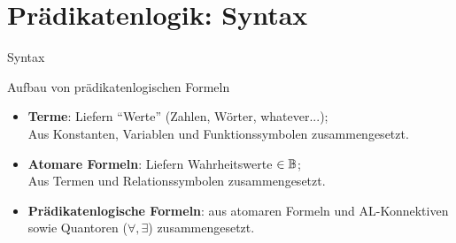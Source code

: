 \newcommand{\plB}{\plfoo{B}}
\newcommand{\plE}{\plfoo{E}}


\section{Prädikatenlogik: Syntax}



\begin{frame}{Syntax}
	\begin{block}{Aufbau von prädikatenlogischen Formeln}
	\begin{itemize}[<+->]
		\item \textbf{Terme}: Liefern \enquote{Werte} (Zahlen, Wörter, whatever...); \\ 
		Aus Konstanten, Variablen und Funktionssymbolen zusammengesetzt.
		\item \textbf{Atomare Formeln}: Liefern Wahrheitswerte $\in \mathbb{B}$; \\
		 Aus Termen und Relationssymbolen zusammengesetzt.
		\item \textbf{Prädikatenlogische Formeln}: aus atomaren Formeln und AL-Konnektiven sowie Quantoren ($\forall, \exists$) zusammengesetzt. 
	\end{itemize}
	\end{block}
\end{frame}

